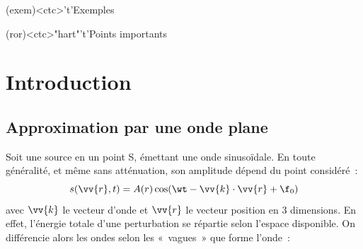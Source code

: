 \documentclass[../../main/main.tex]{subfiles}
\begin{document}
\begin{tcn}[%
		sidebyside, fontupper=\small, fontlower=\small
	]
	\begin{tcn}[nsp](exem)<ctc>'t'{Exemples}
		\vspace{-25pt}
	\end{tcn}
	\begin{tcn}[nsp](ror)<ctc>"hart"'t'{Points importants}
		\vspace{-25pt}
	\end{tcn}
\end{tcn}

\vspace*{\fill}

\newpage

\section{Introduction}
\subsection{Approximation par une onde plane}
Soit une source en un point S, émettant une onde sinusoïdale. En toute
généralité, et même sans atténuation, son amplitude dépend du point considéré~:
\[
	s(\vv{r},t) = A(r) \cos(\wt - \vv{k}\cdot \vv{r} + \f_0)
\]
\smallbreak
\vspace*{-10pt}
\noindent
avec $\vv{k}$ le vecteur d'onde et $\vv{r}$ le vecteur position en 3 dimensions.
En effet, l'énergie totale d'une perturbation se répartie selon l'espace
disponible. On différencie alors les ondes selon les «~vagues~» que forme
l'onde~:
\end{document}
